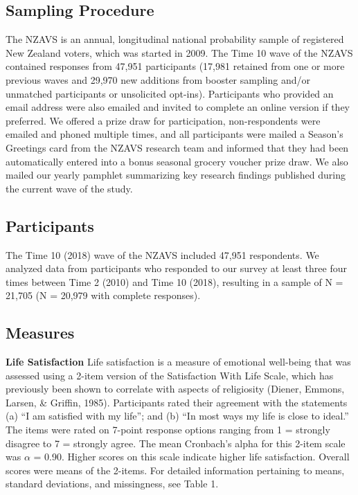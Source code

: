 \documentclass[
  english,
  man]{apa6}
\begin{document}
\hypertarget{sampling-procedure}{%
\subsection{Sampling Procedure}\label{sampling-procedure}}

The NZAVS is an annual, longitudinal national probability sample of registered New Zealand voters, which was started in 2009. The Time 10 wave of the NZAVS contained responses from 47,951 participants (17,981 retained from one or more previous waves and 29,970 new additions from booster sampling and/or unmatched participants or unsolicited opt-ins). Participants who provided an email address were also emailed and invited to complete an online version if they preferred. We offered a prize draw for participation, non-respondents were emailed and phoned multiple times, and all participants were mailed a Season's Greetings card from the NZAVS research team and informed that they had been automatically entered into a bonus seasonal grocery voucher prize draw. We also mailed our yearly pamphlet summarizing key research findings published during the current wave of the study.

\hypertarget{participants}{%
\subsection{Participants}\label{participants}}

The Time 10 (2018) wave of the NZAVS included 47,951 respondents. We analyzed data from participants who responded to our survey at least three four times between Time 2 (2010) and Time 10 (2018), resulting in a sample of N = 21,705 (N = 20,979 with complete responses).

\hypertarget{measures}{%
\subsection{Measures}\label{measures}}

\textbf{Life Satisfaction} Life satisfaction is a measure of emotional well-being that was assessed using a 2-item version of the Satisfaction With Life Scale, which has previously been shown to correlate with aspects of religiosity (Diener, Emmons, Larsen, \& Griffin, 1985). Participants rated their agreement with the statements (a) \enquote{I am satisfied with my life}; and (b) \enquote{In most ways my life is close to ideal.} The items were rated on 7-point response options ranging from 1 = strongly disagree to 7 = strongly agree. The mean Cronbach's alpha for this 2-item scale was \(\alpha\) = 0.90. Higher scores on this scale indicate higher life satisfaction. Overall scores were means of the 2-items. For detailed information pertaining to means, standard deviations, and missingness, see Table 1.
\end{document}
